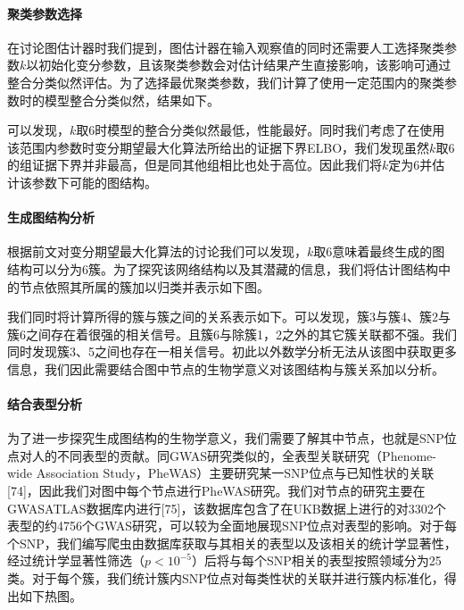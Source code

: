 \documentclass[
]{article}
\begin{document}
\hypertarget{ux805aux7c7bux53c2ux6570ux9009ux62e9}{%
\paragraph{聚类参数选择}\label{ux805aux7c7bux53c2ux6570ux9009ux62e9}}

在讨论图估计器时我们提到，图估计器在输入观察值的同时还需要人工选择聚类参数\(k\)以初始化变分参数，且该聚类参数会对估计结果产生直接影响，该影响可通过整合分类似然评估。为了选择最优聚类参数，我们计算了使用一定范围内的聚类参数时的模型整合分类似然，结果如下。

可以发现，\(k\)取6时模型的整合分类似然最低，性能最好。同时我们考虑了在使用该范围内参数时变分期望最大化算法所给出的证据下界ELBO，我们发现虽然\(k\)取6的组证据下界并非最高，但是同其他组相比也处于高位。因此我们将\(k\)定为6并估计该参数下可能的图结构。

\hypertarget{ux751fux6210ux56feux7ed3ux6784ux5206ux6790}{%
\paragraph{生成图结构分析}\label{ux751fux6210ux56feux7ed3ux6784ux5206ux6790}}

根据前文对变分期望最大化算法的讨论我们可以发现，\(k\)取6意味着最终生成的图结构可以分为6簇。为了探究该网络结构以及其潜藏的信息，我们将估计图结构中的节点依照其所属的簇加以归类并表示如下图。

我们同时将计算所得的簇与簇之间的关系表示如下。可以发现，簇3与簇4、簇2与簇6之间存在着很强的相关信号。且簇6与除簇1，2之外的其它簇关联都不强。我们同时发现簇3、5之间也存在一相关信号。初此以外数学分析无法从该图中获取更多信息，我们因此需要结合图中节点的生物学意义对该图结构与簇关系加以分析。

\hypertarget{ux7ed3ux5408ux8868ux578bux5206ux6790}{%
\paragraph{结合表型分析}\label{ux7ed3ux5408ux8868ux578bux5206ux6790}}

为了进一步探究生成图结构的生物学意义，我们需要了解其中节点，也就是SNP位点对人的不同表型的贡献。同GWAS研究类似的，全表型关联研究（Phenome-wide
Association
Study，PheWAS）主要研究某一SNP位点与已知性状的关联{[}74{]}，因此我们对图中每个节点进行PheWAS研究。我们对节点的研究主要在GWASATLAS数据库内进行{[}75{]}，该数据库包含了在UKB数据上进行的对3302个表型的约4756个GWAS研究，可以较为全面地展现SNP位点对表型的影响。对于每个SNP，我们编写爬虫由数据库获取与其相关的表型以及该相关的统计学显著性，经过统计学显著性筛选（\(p<10^{-5}\)）后将与每个SNP相关的表型按照领域分为25类。对于每个簇，我们统计簇内SNP位点对每类性状的关联并进行簇内标准化，得出如下热图。
\end{document}
